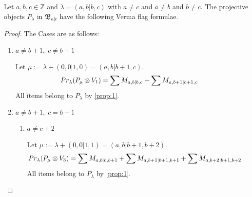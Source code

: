 \begin{theorem}
  Let $a,b,c \in \mathbb{Z}$ and $\lambda = (a,b|b,c)$ with $a \neq c$ and $ a \neq b$ and $b\neq c$. The projective objects $P_{\lambda}$ in $\mathfrak{B}_{a|c}$ have the following Verma flag formulae.
\end{theorem}
\begin{proof} The Cases are as follows:\par
\begin{enumerate}
  \item $a \neq b+1,\; c\neq b+1$ \par
      Let $\mu:=\lambda + (0,0|1,0) = (a,b|b+1,c) $.
      \begin{equation}\notag
        \begin{aligned}
          Pr_{\lambda}(P_\mu \otimes V_{1}) &=
\sum M_{a,b|b,c}
+\sum M_{a,b+1|b+1,c}
        \end{aligned}
      \end{equation}
All items belong to $P_\lambda$ by \cref{prop:1}.

  \item $a \neq b+1,\; c = b+1$ 
    \begin{enumerate}
      \item $ a \neq c+2 $ \par
      Let $\mu:=\lambda + (0,0|1,1) = (a,b|b+1,b+2) $.
      \begin{equation}\notag
        \begin{aligned}
          Pr_{\lambda}(P_\mu \otimes V_{3}) &=
\sum M_{a,b|b,b+1}
+\sum M_{a,b+1|b+1,b+1}
+\sum M_{a,b+2|b+1,b+2}
        \end{aligned}
      \end{equation}
All items belong to $P_\lambda$ by \cref{prop:1}.


\end{enumerate}
\end{enumerate}
\end{proof}
